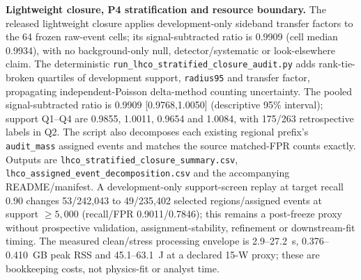 \documentclass[11pt,a4paper]{article}
\numberwithin{equation}{section}
\theoremstyle{definition}\newtheorem{definition}[theorem]{Definition}
\theoremstyle{remark}\newtheorem{remark}[theorem]{Remark}
\begin{document}
\textbf{Lightweight closure, P4 stratification and resource boundary.} The released lightweight closure applies development-only sideband transfer factors to the 64 frozen raw-event cells; its signal-subtracted ratio is 0.9909 (cell median 0.9934), with no background-only null, detector/systematic or look-elsewhere claim. The deterministic \texttt{run\_lhco\_stratified\_closure\_audit.py} adds rank-tie-broken quartiles of development support, \texttt{radius95} and transfer factor, propagating independent-Poisson delta-method counting uncertainty. The pooled signal-subtracted ratio is 0.9909 [0.9768,1.0050] (descriptive 95\% interval); support Q1--Q4 are 0.9855, 1.0011, 0.9654 and 1.0084, with 175/263 retrospective labels in Q2. The script also decomposes each existing regional prefix's \texttt{audit\_mass} assigned events and matches the source matched-FPR counts exactly. Outputs are \texttt{lhco\_stratified\_closure\_summary.csv}, \texttt{lhco\_assigned\_event\_decomposition.csv} and the accompanying README/manifest. A development-only support-screen replay at target recall 0.90 changes 53/242,043 to 49/235,402 selected regions/assigned events at support $\geq5{,}000$ (recall/FPR 0.9011/0.7846); this remains a post-freeze proxy without prospective validation, assignment-stability, refinement or downstream-fit timing. The measured clean/stress processing envelope is 2.9--27.2~s, 0.376--0.410~GB peak RSS and 45.1--63.1~J at a declared 15-W proxy; these are bookkeeping costs, not physics-fit or analyst time.\par
\end{document}
